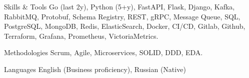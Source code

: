 
\begin{cvskills}

  \cvskill
    {Skills \& Tools} %
    {Go (last 2y), Python (5+y), FastAPI, Flask, Django, Kafka, RabbitMQ, Protobuf, Schema Registry, REST, gRPC, Message Queue, SQL, PostgreSQL, MongoDB, Redis, ElasticSearch, Docker, CI/CD, Gitlab, Github, Terraform, Grafana, Prometheus, VictoriaMetrics.} %

  \cvskill
    {Methodologies} %
    {Scrum, Agile, Microservices, SOLID, DDD, EDA.} %

  \cvskill
    {Languages} %
    {English (Business proficiency), Russian (Native)} %

\end{cvskills}
